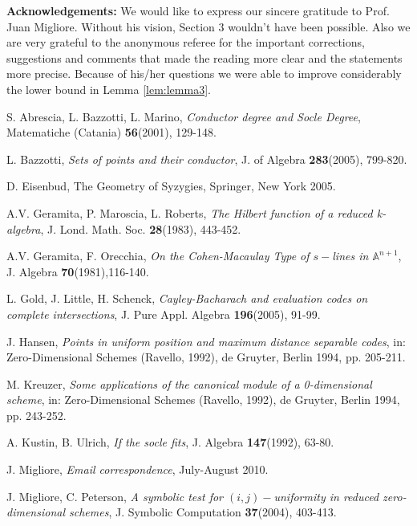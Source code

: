 \documentclass[12pt]{amsart}
\begin{document}
\noindent\textbf{Acknowledgements:} We would like to express our sincere gratitude to Prof. Juan Migliore. Without his vision, Section 3 wouldn't have been possible. Also we are very grateful to the anonymous referee for the important corrections, suggestions and comments that made the reading more clear and the statements more precise. Because of his/her questions we were able to improve considerably the lower bound in Lemma \ref{lem:lemma3}.

\small\normalsize 


\begin{thebibliography}{10}
 S. Abrescia, L. Bazzotti, L. Marino,
            {\em Conductor degree and Socle Degree},
            Matematiche (Catania) \textbf{56}(2001), 129-148.

 L. Bazzotti,
            {\em Sets of points and their conductor},
            J. of Algebra \textbf{283}(2005), 799-820.

 D. Eisenbud,
            The Geometry of Syzygies, Springer, New York 2005.

 A.V. Geramita, P. Maroscia, L. Roberts,
            {\em The Hilbert function of a reduced k-algebra},
            J. Lond. Math. Soc. \textbf{28}(1983), 443-452.

 A.V. Geramita, F. Orecchia,
            {\em On the Cohen-Macaulay Type of $s-$lines in $\mathbb A^{n+1}$},
            J. Algebra \textbf{70}(1981),116-140.

 L. Gold, J. Little, H. Schenck,
            {\em Cayley-Bacharach and evaluation codes on complete intersections},
            J. Pure Appl. Algebra \textbf{196}(2005), 91-99.

 J. Hansen,
            {\em Points in uniform position and maximum distance separable codes},
            in: Zero-Dimensional Schemes (Ravello, 1992), de Gruyter, Berlin 1994, pp. 205-211.

 M. Kreuzer,
            {\em Some applications of the canonical module of a 0-dimensional scheme},
            in: Zero-Dimensional Schemes (Ravello, 1992), de Gruyter, Berlin 1994, pp. 243-252.

 A. Kustin, B. Ulrich,
            {\em If the socle fits},
            J. Algebra \textbf{147}(1992), 63-80.

 J. Migliore,
            {\em Email correspondence}, July-August 2010.

 J. Migliore, C. Peterson,
            {\em A symbolic test for $(i,j)-$uniformity in reduced zero-dimensional schemes},
            J. Symbolic Computation \textbf{37}(2004), 403-413.


\end{thebibliography}
\end{document}
